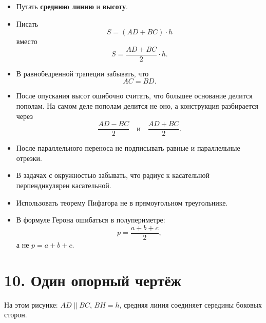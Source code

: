 \documentclass[a4paper,12pt]{article}
\newcommand{\med}{m}
\newcommand{\Area}{S}
\begin{document}
\begin{itemize}
    \item Путать \textbf{среднюю линию} и \textbf{высоту}.
    \item Писать
    \[
    \Area=(AD+BC)\cdot h
    \]
    вместо
    \[
    \Area=\frac{AD+BC}{2}\cdot h.
    \]
    \item В равнобедренной трапеции забывать, что
    \[
    AC=BD.
    \]
    \item После опускания высот ошибочно считать, что большее основание делится пополам. На самом деле пополам делится не оно, а конструкция разбирается через
    \[
    \frac{AD-BC}{2}
    \quad \text{и} \quad
    \frac{AD+BC}{2}.
    \]
    \item После параллельного переноса не подписывать равные и параллельные отрезки.
    \item В задачах с окружностью забывать, что радиус к касательной перпендикулярен касательной.
    \item Использовать теорему Пифагора не в прямоугольном треугольнике.
    \item В формуле Герона ошибаться в полупериметре:
    \[
    p=\frac{a+b+c}{2},
    \]
    а не $p=a+b+c$.
\end{itemize}

\section*{\textcolor{darkaccent}{10. Один опорный чертёж}}

\begin{center}
\end{center}

\vspace{-0.5em}
\begin{center}
\small
На этом рисунке: $AD \parallel BC$, $BH=h$, средняя линия соединяет середины боковых сторон.
\end{center}
\end{document}
